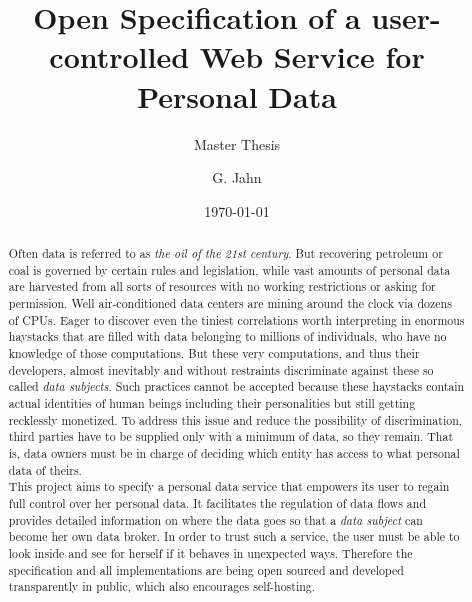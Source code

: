 \documentclass[12pt,english,a4paper,titlepage,cleardoublepage=empty,dottedtoc]{report}
\title{Open Specification of a user-controlled Web Service for Personal Data}
\subtitle{Master Thesis}
\author{G. Jahn}
\date{\today}
\begin{document}

\begin{abstract}
Often data is referred to as \emph{the oil of the 21st century}. But
recovering petroleum or coal is governed by certain rules and
legislation, while vast amounts of personal data are harvested from all
sorts of resources with no working restrictions or asking for
permission. Well air-conditioned data centers are mining around the
clock via dozens of CPUs. Eager to discover even the tiniest
correlations worth interpreting in enormous haystacks that are filled
with data belonging to millions of individuals, who have no knowledge of
those computations. But these very computations, and thus their
developers, almost inevitably and without restraints discriminate
against these so called \emph{data subjects}. Such practices cannot be
accepted because these haystacks contain actual identities of human
beings including their personalities but still getting recklessly
monetized. To address this issue and reduce the possibility of
discrimination, third parties have to be supplied only with a minimum of
data, so they remain. That is, data owners must be in charge of deciding
which entity has access to what personal data of theirs.\\
This project aims to specify a personal data service that empowers its
user to regain full control over her personal data. It facilitates the
regulation of data flows and provides detailed information on where the
data goes so that a \emph{data subject} can become her own data broker.
In order to trust such a service, the user must be able to look inside
and see for herself if it behaves in unexpected ways. Therefore the
specification and all implementations are being open sourced and
developed transparently in public, which also encourages self-hosting.
\end{abstract}

\end{document}
